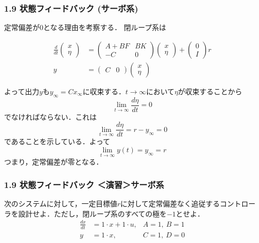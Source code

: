 \documentclass[10pt]{beamer}
\begin{document}
\begin{frame}[t]
\frametitle{1.9 状態フィードバック (サーボ系)}
定常偏差が$0$となる理由を考察する．
閉ループ系は
\addtocounter{equation}{-2}
\begin{align}
 \frac{d}{dt}
  \left(\begin{array}{c}
         x \\
   \eta
  \end{array}\right)
  &=
  \left(\begin{array}{cc}
         A + B F & B K \\
   - C     & 0
  \end{array}\right)
  \left(\begin{array}{c}
         x \\
   \eta
  \end{array}\right)
  +
  \left(\begin{array}{c}
         0 \\
   I
  \end{array}\right)
  r \\
 y &=
  \left(\begin{array}{cc}
         C & 0
  \end{array}\right)
  \left(\begin{array}{c}
         x \\
   \eta
  \end{array}\right)
\end{align}

よって出力$y$も$y_{\infty} = C x_{\infty}$に収束する．$t
\rightarrow \infty $において$\eta$が収束することから
\begin{equation}
 \lim_{t \rightarrow \infty} \frac{d \eta}{dt} = 0
\end{equation}
でなければならない．これは
\begin{equation}
 \lim_{t \rightarrow \infty} \frac{d \eta}{dt}
  = r - y_{\infty} = 0
\end{equation}
であることを示している．よって
\begin{equation}
   \lim_{t \rightarrow \infty} y(t) = y_\infty= r
\end{equation}
つまり，定常偏差が零となる．
\end{frame}

\begin{frame}[t]
\frametitle{1.9 状態フィードバック ＜演習＞サーボ系}
次のシステムに対して，一定目標値$r$に対して定常偏差なく追従するコントローラを設計せよ．ただし，閉ループ系のすべての極を$-1$とせよ．
\begin{align*}
	\frac{dx}{dt} &= 1 \cdot x + 1 \cdot u,   &A=1,\  B=1
\\
	y &= 1 \cdot x , &C=1, \ D=0
\end{align*}
\end{frame}
\end{document}
